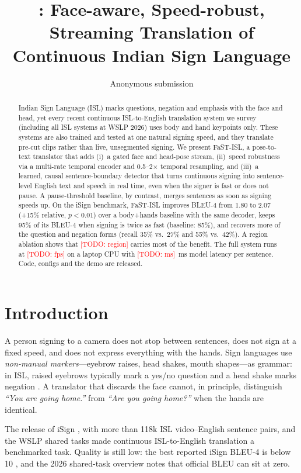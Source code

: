 \documentclass[11pt]{article}
\title{\fast: Face-aware, Speed-robust, Streaming Translation of\\Continuous Indian Sign Language}
\author{Anonymous submission}
\newcommand{\todo}[1]{\textcolor{red}{[TODO: #1]}}
\newcommand{\fast}{FaST-ISL}
\begin{document}
\maketitle

\begin{abstract}
Indian Sign Language (ISL) marks questions, negation and emphasis with the face and head, yet every
recent continuous ISL-to-English translation system we survey (including all ISL systems at WSLP 2026)
uses body and hand keypoints only. These systems are also trained and tested at one natural signing
speed, and they translate pre-cut clips rather than live, unsegmented signing. We present \fast{}, a
pose-to-text translator that adds (i)~a gated face and head-pose stream, (ii)~speed robustness via a
multi-rate temporal encoder and 0.5--2$\times$ temporal resampling, and (iii)~a learned, causal
sentence-boundary detector that turns continuous signing into sentence-level English text and speech in
real time, even when the signer is fast or does not pause. A pause-threshold baseline, by contrast,
merges sentences as soon as signing speeds up. On
the iSign benchmark, \fast{} improves BLEU-4 from 1.80 to 2.07 (+15\% relative, $p<0.01$) over a
body+hands baseline with the same decoder, keeps 95\% of its BLEU-4 when signing is twice as
fast (baseline: 85\%), and recovers more of the question and negation forms (recall 35\% vs.\ 27\% and
55\% vs.\ 42\%). A region
ablation shows that \todo{region} carries most of the benefit. The full system runs at \todo{fps} on
a laptop CPU with \todo{ms}~ms model latency per sentence. Code, configs and the demo are released.
\end{abstract}

\section{Introduction}

A person signing to a camera does not stop between sentences, does not sign at a fixed speed, and
does not express everything with the hands. Sign languages use \emph{non-manual markers}---eyebrow
raises, head shakes, mouth shapes---as grammar: in ISL, raised eyebrows typically mark a yes/no question
and a head shake marks negation \citep{joshi2024isign}. A translator that discards the face cannot, in
principle, distinguish \emph{``You are going home.''} from \emph{``Are you going home?''} when the hands
are identical.

The release of iSign \citep{joshi2024isign}, with more than 118k ISL video--English sentence pairs, and
the WSLP shared tasks \citep{wslp2026findings} made continuous ISL-to-English translation a benchmarked
task. Quality is still low: the best reported iSign BLEU-4 is below 10 \citep{roychowdhury2025motion},
and the 2026 shared-task overview notes that official BLEU can sit at zero.
\end{document}
